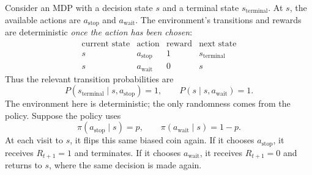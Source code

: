 \documentclass[11pt,a4paper]{article}
\theoremstyle{definition}
\begin{document}
\begin{example}
Consider an MDP with a decision state $s$ and a terminal state
$s_{\mathrm{terminal}}$. At $s$, the available actions are
$a_{\mathrm{stop}}$ and $a_{\mathrm{wait}}$. The environment's transitions and rewards are
deterministic \emph{once the action has been chosen}:
\[
\begin{array}{c|c|c|c}
\text{current state} & \text{action} & \text{reward} & \text{next state}\\
\hline
s & a_{\mathrm{stop}} & 1 & s_{\mathrm{terminal}}\\
s & a_{\mathrm{wait}} & 0 & s
\end{array}
\]
Thus the relevant transition probabilities are
\[
P(s_{\mathrm{terminal}}\mid s,a_{\mathrm{stop}})=1,
\qquad
P(s\mid s,a_{\mathrm{wait}})=1.
\]
The environment here is deterministic; the only randomness comes from the policy. Suppose
the policy uses
\[
\pi(a_{\mathrm{stop}}\mid s)=p,
\qquad
\pi(a_{\mathrm{wait}}\mid s)=1-p.
\]
At each visit to $s$, it flips this same biased coin again. If it chooses
$a_{\mathrm{stop}}$, it receives $R_{t+1}=1$ and terminates. If it chooses
$a_{\mathrm{wait}}$, it receives $R_{t+1}=0$ and returns to $s$, where the same decision is
made again.


\end{example}
\end{document}
